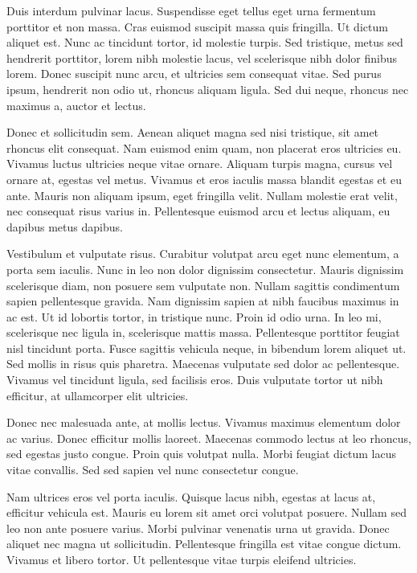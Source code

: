 Duis interdum pulvinar lacus. Suspendisse eget tellus eget urna fermentum porttitor et non massa. Cras euismod suscipit massa quis fringilla. Ut dictum aliquet est. Nunc ac tincidunt tortor, id molestie turpis. Sed tristique, metus sed hendrerit porttitor, lorem nibh molestie lacus, vel scelerisque nibh dolor finibus lorem. Donec suscipit nunc arcu, et ultricies sem consequat vitae. Sed purus ipsum, hendrerit non odio ut, rhoncus aliquam ligula. Sed dui neque, rhoncus nec maximus a, auctor et lectus.

Donec et sollicitudin sem. Aenean aliquet magna sed nisi tristique, sit amet rhoncus elit consequat. Nam euismod enim quam, non placerat eros ultricies eu. Vivamus luctus ultricies neque vitae ornare. Aliquam turpis magna, cursus vel ornare at, egestas vel metus. Vivamus et eros iaculis massa blandit egestas et eu ante. Mauris non aliquam ipsum, eget fringilla velit. Nullam molestie erat velit, nec consequat risus varius in. Pellentesque euismod arcu et lectus aliquam, eu dapibus metus dapibus.

Vestibulum et vulputate risus. Curabitur volutpat arcu eget nunc elementum, a porta sem iaculis. Nunc in leo non dolor dignissim consectetur. Mauris dignissim scelerisque diam, non posuere sem vulputate non. Nullam sagittis condimentum sapien pellentesque gravida. Nam dignissim sapien at nibh faucibus maximus in ac est. Ut id lobortis tortor, in tristique nunc. Proin id odio urna. In leo mi, scelerisque nec ligula in, scelerisque mattis massa. Pellentesque porttitor feugiat nisl tincidunt porta. Fusce sagittis vehicula neque, in bibendum lorem aliquet ut. Sed mollis in risus quis pharetra. Maecenas vulputate sed dolor ac pellentesque. Vivamus vel tincidunt ligula, sed facilisis eros. Duis vulputate tortor ut nibh efficitur, at ullamcorper elit ultricies.

Donec nec malesuada ante, at mollis lectus. Vivamus maximus elementum dolor ac varius. Donec efficitur mollis laoreet. Maecenas commodo lectus at leo rhoncus, sed egestas justo congue. Proin quis volutpat nulla. Morbi feugiat dictum lacus vitae convallis. Sed sed sapien vel nunc consectetur congue.

Nam ultrices eros vel porta iaculis. Quisque lacus nibh, egestas at lacus at, efficitur vehicula est. Mauris eu lorem sit amet orci volutpat posuere. Nullam sed leo non ante posuere varius. Morbi pulvinar venenatis urna ut gravida. Donec aliquet nec magna ut sollicitudin. Pellentesque fringilla est vitae congue dictum. Vivamus et libero tortor. Ut pellentesque vitae turpis eleifend ultricies.

